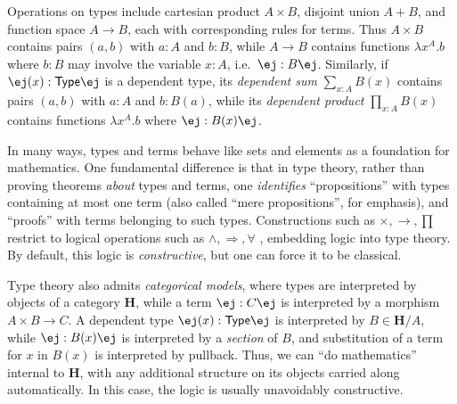 \documentclass[copyright,12pt]{eptcs}
\makeatletter
\newcommand{\type}{\ensuremath{\mathsf{Type}}\xspace}
\renewcommand{\H}{\ensuremath{\mathbf{H}}\xspace}
\def\jd#1{\@jd#1\ej}
\def\@jd#1|-#2\ej{\@@jd#1,,\;\vdash\;\left(#2\right)}
\def\@@jd#1,{\@ifmtarg{#1}{\let\next=\relax}{\left(#1\right)\let\next=\@@@jd}\next}
\def\@@@jd#1,{\@ifmtarg{#1}{\let\next=\relax}{,\,\left(#1\right)\let\next=\@@@jd}\next}
\makeatother
\begin{document}
Operations on types include cartesian product $A\times B$, disjoint union $A+B$, and function space $A\to B$, each with corresponding rules for terms.
Thus $A\times B$ contains pairs $(a,b)$ with $a:A$ and $b:B$, while $A\to B$ contains functions $\lambda x^A.b$ where $b:B$ may involve the variable $x:A$, i.e.\ $\jd{x:A |- b:B}$.
%
%
Similarly, if $\jd{x:A |- B(x):\type}$ is a dependent type, its \emph{dependent sum} $\sum_{x:A} B(x)$ contains pairs $(a,b)$ with $a:A$ and $b:B(a)$, while its \emph{dependent product} $\prod_{x:A} B(x)$ contains functions $\lambda x^A .b$ where $\jd{x:A |- b : B(x)}$.

In many ways, types and terms behave like sets and elements as a foundation for mathematics.
One fundamental difference is that
in type theory, rather than proving theorems \emph{about} types and terms, one \emph{identifies}
``propositions'' with
types containing at most one term
(also called ``mere propositions'', for emphasis),
and ``proofs'' with terms belonging to such types.
Constructions such as $\times,\to,\prod$ restrict to logical operations such as $\wedge,\Rightarrow,\forall$%
, embedding logic into type theory.
By default, this logic is \emph{constructive}, but one can force it to be classical.

Type theory also admits \emph{categorical models}, where types are interpreted by objects of a category $\H$, while a term $\jd{x:A, y:B |- c:C}$ is interpreted by a morphism $A\times B\to C$.
A dependent type $\jd{x:A |- B(x):\type}$ is interpreted by $B\in\H/A$, while $\jd{x:A|- b:B(x)}$ is interpreted  by a \emph{section} of $B$, and substitution of a term for $x$ in $B(x)$ is interpreted by pullback.
Thus, we can ``do mathematics'' internal to \H, with any additional structure on its objects
carried along automatically.
In this case, the logic is usually unavoidably constructive.
\end{document}
